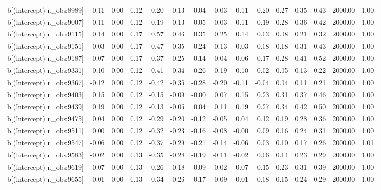 \begin{table}[ht]
\begin{tabular}{rrrrrrrrrrrrrrr}
  b[(Intercept) n\_obs:8989] & 0.11 & 0.00 & 0.12 & -0.20 & -0.13 & -0.04 & 0.03 & 0.11 & 0.20 & 0.27 & 0.35 & 0.43 & 2000.00 & 1.00 \\ 
  b[(Intercept) n\_obs:9007] & 0.11 & 0.00 & 0.12 & -0.19 & -0.13 & -0.05 & 0.03 & 0.11 & 0.19 & 0.28 & 0.36 & 0.42 & 2000.00 & 1.00 \\ 
  b[(Intercept) n\_obs:9115] & -0.14 & 0.00 & 0.17 & -0.57 & -0.46 & -0.35 & -0.25 & -0.14 & -0.03 & 0.08 & 0.21 & 0.32 & 2000.00 & 1.00 \\ 
  b[(Intercept) n\_obs:9151] & -0.03 & 0.00 & 0.17 & -0.47 & -0.35 & -0.24 & -0.13 & -0.03 & 0.08 & 0.18 & 0.31 & 0.43 & 2000.00 & 1.00 \\ 
  b[(Intercept) n\_obs:9187] & 0.07 & 0.00 & 0.17 & -0.37 & -0.25 & -0.14 & -0.04 & 0.06 & 0.17 & 0.28 & 0.41 & 0.52 & 2000.00 & 1.00 \\ 
  b[(Intercept) n\_obs:9331] & -0.10 & 0.00 & 0.12 & -0.41 & -0.34 & -0.26 & -0.19 & -0.10 & -0.02 & 0.05 & 0.13 & 0.22 & 2000.00 & 1.00 \\ 
  b[(Intercept) n\_obs:9367] & -0.12 & 0.00 & 0.12 & -0.42 & -0.36 & -0.28 & -0.20 & -0.11 & -0.04 & 0.04 & 0.11 & 0.21 & 2000.00 & 1.00 \\ 
  b[(Intercept) n\_obs:9403] & 0.15 & 0.00 & 0.12 & -0.15 & -0.09 & -0.00 & 0.07 & 0.15 & 0.23 & 0.31 & 0.37 & 0.46 & 2000.00 & 1.00 \\ 
  b[(Intercept) n\_obs:9439] & 0.19 & 0.00 & 0.12 & -0.13 & -0.05 & 0.04 & 0.11 & 0.19 & 0.27 & 0.34 & 0.42 & 0.50 & 2000.00 & 1.00 \\ 
  b[(Intercept) n\_obs:9475] & 0.04 & 0.00 & 0.12 & -0.29 & -0.20 & -0.12 & -0.05 & 0.04 & 0.12 & 0.19 & 0.28 & 0.36 & 2000.00 & 1.00 \\ 
  b[(Intercept) n\_obs:9511] & 0.00 & 0.00 & 0.12 & -0.32 & -0.23 & -0.16 & -0.08 & -0.00 & 0.09 & 0.16 & 0.24 & 0.31 & 2000.00 & 1.00 \\ 
  b[(Intercept) n\_obs:9547] & -0.06 & 0.00 & 0.12 & -0.37 & -0.29 & -0.21 & -0.14 & -0.06 & 0.03 & 0.10 & 0.17 & 0.26 & 2000.00 & 1.01 \\ 
  b[(Intercept) n\_obs:9583] & -0.02 & 0.00 & 0.13 & -0.35 & -0.28 & -0.19 & -0.11 & -0.02 & 0.06 & 0.14 & 0.23 & 0.29 & 2000.00 & 1.00 \\ 
  b[(Intercept) n\_obs:9619] & 0.07 & 0.00 & 0.13 & -0.26 & -0.18 & -0.09 & -0.02 & 0.07 & 0.15 & 0.23 & 0.31 & 0.39 & 2000.00 & 1.00 \\ 
  b[(Intercept) n\_obs:9655] & -0.01 & 0.00 & 0.13 & -0.34 & -0.26 & -0.17 & -0.09 & -0.01 & 0.08 & 0.15 & 0.24 & 0.29 & 2000.00 & 1.00 \\ 

\end{tabular}
\end{table}
